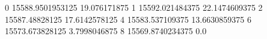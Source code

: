 0 15588.9501953125 19.076171875
1 15592.021484375 22.1474609375
2 15587.48828125 17.6142578125
4 15583.537109375 13.6630859375
6 15573.673828125 3.7998046875
8 15569.8740234375 0.0
